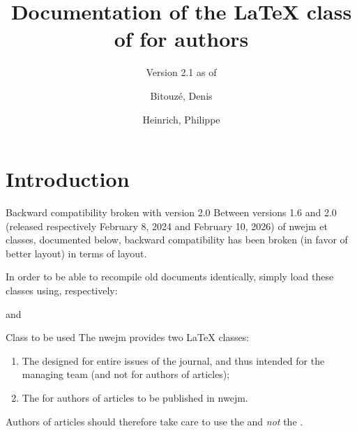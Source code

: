 \documentclass[english,nolocaltoc]{nwejmart}
\newcommand{\releaseversion}{2.1}
\newtheorem[style=definition]{fact}
\newtheorem[title-plural=Criteria]{criterion}
\newtheorem[title=random experiment]{rexp}
\begin{document}
\title[Documentation of the \LaTeX{} class of
\texorpdfstring{\nwejm}{NWEJM}]{Documentation of the \LaTeX{} class of \nwejm*{}
  for authors}%
%
\subtitle[Version \releaseversion{} (\DTMusedate{release-date})]{\small Version
  \releaseversion{} as of }%
%
\author[%
  affiliation={%
    Université du Littoral Côte d'Opale, Laboratoire de mathématiques pures et
    appliquées (\nolinkurl{denis.bitouze@univ-littoral.fr})%
  },%
]{Bitouzé, Denis}
\author[%
  affiliation={%
    Université de Lille, Laboratoire Paul Painlevé UMR CNRS 8524
    (\nolinkurl{philippe.heinrich@univ-lille.fr})%
  },%
]{Heinrich, Philippe}
%
\maketitle
%
\etocarticlestylenomarks
\localtableofcontents
%

\section{Introduction}
\label{sec-introduction}

\begin{dbwarning}{Backward compatibility broken with version 2.0}{}
  Between versions 1.6 and 2.0 (released respectively February 8, 2024 and
  February 10, 2026) of \textsf{nwejm} et \nwejmauthor{} classes, documented
  below, backward compatibility has been broken (in favor of better layout) in
  terms of layout.

  In order to be able to recompile old documents identically, simply load these
  classes using, respectively:
  and
\end{dbwarning}

\begin{dbwarning}{Class to be used}{}
  The \gls{nwejm} provides two \LaTeX{} classes:
  \begin{enumerate}
  \item The \nwejmcl{} designed for entire issues of the journal, and thus intended for the \nwejm{} managing team (and not for authors of articles);
  \item The \nwejmauthorcl{} for authors of articles to be published in \gls{nwejm}.
  \end{enumerate}
  Authors of articles should therefore take care to use the \nwejmauthorcl{}
  and \emph{not} the \nwejmcl{}.
\end{dbwarning}
\end{document}
